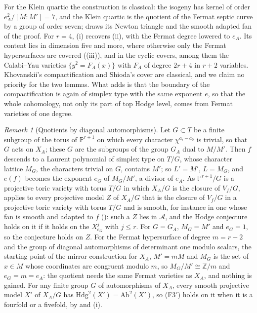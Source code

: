 \documentclass[11pt,reqno]{amsart}
\theoremstyle{plain}
\theoremstyle{definition}
\theoremstyle{remark}
\newtheorem{remark}[theorem]{Remark}
\newcommand{\ZZ}{\mathbb{Z}}
\newcommand{\PP}{\mathbb{P}}
\newcommand{\Hdg}{\mathrm{Hdg}}
\begin{document}
For the Klein quartic the construction is classical: the isogeny has kernel
of order $e_{A}^{2}/[M:M']=7$, and the Klein quartic is the quotient of the
Fermat septic curve by a group of order seven;  draws
its Newton triangle and the smooth adapted fan of the proof. For $r=4$,
(i) recovers (ii), with the Fermat
degree lowered to $e_{A}$. Its content lies in dimension five and more, where
otherwise only the Fermat hypersurfaces are covered
((iii)), and in the cyclic covers, among them the Calabi--Yau
varieties $\{y^{2}=F_{A}(x)\}$ with $F_{A}$ of degree $2r+4$ in $r+2$
variables. Khovanskii's compactification and Shioda's cover are classical, and
we claim no priority for the two lemmas. What  adds is
that the boundary of the compactification is again of simplex type with the
same exponent $e$, so that the whole cohomology, not only its part of top
Hodge level, comes from Fermat varieties of one degree.

\begin{remark}[Quotients by diagonal automorphisms]\label{rem:delsartequotient}
Let $G\subset T$ be a finite subgroup of the torus of $\PP^{r+1}$ on which
every character $\chi^{a_{i}-a_{0}}$ is trivial, so that $G$ acts on $X_{A}$;
these $G$ are the subgroups of the group $G_{A}$ dual to $M/M'$. Then $f$
descends to a Laurent polynomial of simplex type on $T/G$, whose character
lattice $M_{G}$, the characters trivial on $G$, contains $M'$; so $L'=M'$,
$L=M_{G}$, and $e(f)$ becomes the exponent $e_{G}$ of $M_{G}/M'$, a divisor of
$e_{A}$. As $\PP^{r+1}/G$ is a projective toric variety with torus $T/G$ in
which $X_{A}/G$ is the closure of $V_{f}/G$,  applies
to every projective model $Z$ of $X_{A}/G$ that is the closure of $V_{f}/G$
in a projective toric variety with torus $T/G$ and is smooth, for instance in
one whose fan is smooth and adapted to $f$ (): such a
$Z$ lies in $\mathcal{A}$, and the Hodge conjecture holds on it if it holds
on the $X^{j}_{e_{G}}$ with $j\le r$. For $G=G_{A}$, $M_{G}=M'$ and $e_{G}=1$,
so the conjecture holds on $Z$. For the Fermat hypersurface of degree
$m=r+2$ and the group of diagonal automorphisms of determinant one modulo
scalars, the starting point of the mirror construction for $X_{A}$, $M'=mM$
and $M_{G}$ is the set of $x\in M$ whose coordinates are congruent modulo
$m$, so $M_{G}/M'\cong\ZZ/m$ and $e_{G}=m=e_{A}$: the quotient needs the
same Fermat varieties as $X_{A}$, and nothing is gained. For any finite
group $G$ of automorphisms of $X_{A}$, every smooth projective model $X'$ of
$X_{A}/G$ has $\Hdg^{2}(X')=\mathrm{Ab}^{2}(X')$, so \textup{(F3$'$)} holds on
it when it is a fourfold or a fivefold, by  and
(i).
\end{remark}
\end{document}
